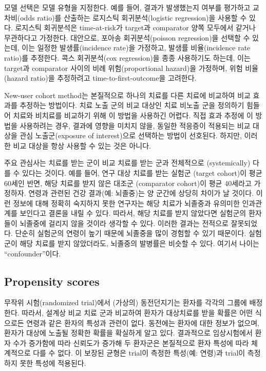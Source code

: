 \documentclass[]{book}
\begin{document}
모델 선택은 모델 유형을 지정한다. 예를 들어, 결과가 발생했는지 여부를 평가하고 교차비(odds ratio)를 산출하는 로지스틱 회귀분석(logistic regression)을 사용할 수 있다. 로지스틱 회귀분석은 time-at-risk가 target과 comparator 양쪽 모두에서 같거나 무관하다고 가정한다. 대안으로, 포아송 회귀분석(poisson regression)을 선택할 수 있는데, 이는 일정한 발생률(incidence rate)을 가정하고, 발생률 비율(incidence rate ratio)를 추정한다. 콕스 회귀분석(cox regression)을 종종 사용하기도 하는데, 이는 target과 comparator 사이의 비례 위험(proportional hazard)을 가정하며, 위험 비율(hazard ratio)을 추정하려고 time-to-first-outcome을 고려한다.    

New-user cohort method는 본질적으로 하나의 치료를 다른 치료에 비교하여 비교 효과를 추정하는 방법이다. 치료 노출 군의 비교 대상인 치료 비노출 군을 정의하기 힘들어 치료와 비치료를 비교하기 위해 이 방법을 사용하긴 어렵다. 직접 효과 추정에 이 방법을 사용하려는 경우, 결과에 영향을 미치지 않을, 동일한 적응증이 적용되는 비교 대상을 관심 노출군(exposure of interest)으로 선택하는 방법이 선호된다. 하지만, 이러한 비교 대상을 항상 사용할 수 있는 것은 아니다.

주요 관심사는 치료를 받는 군이 비교 치료를 받는 군과 전체적으로 (systemically) 다를 수 있다는 것이다. 예를 들어, 연구 대상 치료를 받는 실험군 (target cohort)이 평균 60세인 반면, 해당 치료를 받지 않은 대조군 (comparator cohort)이 평균 40세라고 가정하자. 연령과 관련된 건강 결과(예: 뇌졸중)는 양 군간에 상당히 차이가 날 것이다. 이런 정보에 대해 정확히 숙지하지 못한 연구자는 해당 치료가 뇌졸중과 유의미한 인과관계를 보인다고 결론을 내릴 수 있다. 따라서, 해당 치료를 받지 않았다면 실험군의 환자들이 뇌졸중에 걸리지 않을 것이라 생각할 수 있다. 이러한 결과는 전적으로 잘못되었다. 단순히 실험군의 연령이 높기 때문에 뇌졸중을 많이 경험할 수 있기 때문이다. 실험군이 해당 치료를 받지 않았더라도, 뇌졸중의 발병률은 비슷할 수 있다. 여기서 나이는 ``confounder''이다. 

\hypertarget{propensity-scores}{%
\subsection{Propensity scores}\label{propensity-scores}}


무작위 시험(randomized trial)에서 (가상의) 동전던지기는 환자를 각각의 그룹에 배정한다. 따라서, 설계상 비교 치료 군과 비교하여 환자가 대상치료를 받을 확률은 어떤 식으로든 연령과 같은 환자의 특성과 관련이 없다. 동전에는 환자에 대한 정보가 없으며, 환자가 대상에 노출될 정확한 확률을 확실하게 알고 있다. 결과적으로 임상시험에서 환자 수가 증가함에 따라 신뢰도가 증가해 두 환자군은 본질적으로 환자 특성에 따라 체계적으로 다를 수 없다. 이 보장된 균형은 trial이 측정한 특성(예: 연령)과 trial이 측정하지 못한 특성에 적용된다. 
\end{document}
